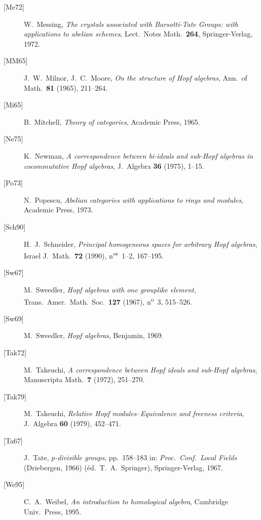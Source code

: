 \begin{description}
  \item[\textup{[Me72]}] W.~Messing,
  \emph{The crystals associated with Barsotti-Tate Groups:
  with applications to abelian schemes},
  Lect.\ Notes Math.\ \textbf{264}, Springer-Verlag, 1972.

  \item[\textup{[MM65]}] J.~W.~Milnor, J.~C.~Moore,
  \emph{On the structure of Hopf algebras},
  Ann.\ of Math.\ \textbf{81} (1965), 211--264.

  \item[\textup{[Mi65]}] B.~Mitchell,
  \emph{Theory of categories}, Academic Press, 1965.

  \item[\textup{[Ne75]}] K.~Newman,
  \emph{A correspondence between bi-ideals and sub-Hopf
  algebras in cocommutative Hopf algebras},
  J.\ Algebra \textbf{36} (1975), 1--15.

  \item[\textup{[Po73]}] N.~Popescu,
  \emph{Abelian categories with applications to rings and
  modules}, Academic Press, 1973.

  \item[\textup{[Sch90]}] H.~J.~Schneider,
  \emph{Principal homogeneous spaces for arbitrary Hopf
  algebras}, Israel J.\ Math.\ \textbf{72} (1990),
  n\textsuperscript{os}~1--2, 167--195.

  \item[\textup{[Sw67]}] M.~Sweedler,
  \emph{Hopf algebras with one grouplike element},
  Trans.\ Amer.\ Math.\ Soc.\ \textbf{127} (1967),
  n\textsuperscript{o}~3, 515--526.

  \item[\textup{[Sw69]}] M.~Sweedler,
  \emph{Hopf algebras}, Benjamin, 1969.

  \item[\textup{[Tak72]}] M.~Takeuchi,
  \emph{A correspondence between Hopf ideals and sub-Hopf
  algebras}, Manuscripta Math.\ \textbf{7} (1972), 251--270.

  \item[\textup{[Tak79]}] M.~Takeuchi,
  \emph{Relative Hopf modules--Equivalence and freeness
  criteria}, J.\ Algebra \textbf{60} (1979), 452--471.

  \item[\textup{[Ta67]}] J.~Tate,
  \emph{\(p\)-divisible groups}, pp.~158--183 in:
  \emph{Proc.\ Conf.\ Local Fields} (Driebergen, 1966)
  (\'ed.\ T.~A.~Springer), Springer-Verlag, 1967.

  \item[\textup{[We95]}] C.~A.~Weibel,
  \emph{An introduction to homological algebra},
  Cambridge Univ.\ Press, 1995.
\end{description}

